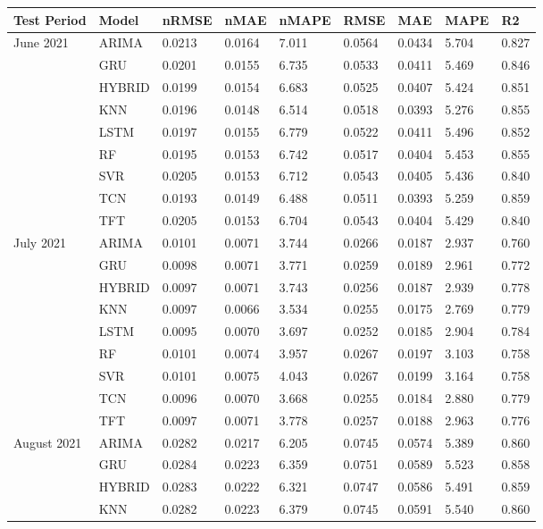 \begin{tabular}{lllllllll}
\toprule
Test Period & Model & nRMSE & nMAE & nMAPE & RMSE & MAE & MAPE & R2 \\
\midrule
June 2021 & ARIMA & 0.0213 & 0.0164 & 7.011 & 0.0564 & 0.0434 & 5.704 & 0.827 \\
 & GRU & 0.0201 & 0.0155 & 6.735 & 0.0533 & 0.0411 & 5.469 & 0.846 \\
 & HYBRID & 0.0199 & 0.0154 & 6.683 & 0.0525 & 0.0407 & 5.424 & 0.851 \\
 & KNN & 0.0196 & 0.0148 & 6.514 & 0.0518 & 0.0393 & 5.276 & 0.855 \\
 & LSTM & 0.0197 & 0.0155 & 6.779 & 0.0522 & 0.0411 & 5.496 & 0.852 \\
 & RF & 0.0195 & 0.0153 & 6.742 & 0.0517 & 0.0404 & 5.453 & 0.855 \\
 & SVR & 0.0205 & 0.0153 & 6.712 & 0.0543 & 0.0405 & 5.436 & 0.840 \\
 & TCN & 0.0193 & 0.0149 & 6.488 & 0.0511 & 0.0393 & 5.259 & 0.859 \\
 & TFT & 0.0205 & 0.0153 & 6.704 & 0.0543 & 0.0404 & 5.429 & 0.840 \\
July 2021 & ARIMA & 0.0101 & 0.0071 & 3.744 & 0.0266 & 0.0187 & 2.937 & 0.760 \\
 & GRU & 0.0098 & 0.0071 & 3.771 & 0.0259 & 0.0189 & 2.961 & 0.772 \\
 & HYBRID & 0.0097 & 0.0071 & 3.743 & 0.0256 & 0.0187 & 2.939 & 0.778 \\
 & KNN & 0.0097 & 0.0066 & 3.534 & 0.0255 & 0.0175 & 2.769 & 0.779 \\
 & LSTM & 0.0095 & 0.0070 & 3.697 & 0.0252 & 0.0185 & 2.904 & 0.784 \\
 & RF & 0.0101 & 0.0074 & 3.957 & 0.0267 & 0.0197 & 3.103 & 0.758 \\
 & SVR & 0.0101 & 0.0075 & 4.043 & 0.0267 & 0.0199 & 3.164 & 0.758 \\
 & TCN & 0.0096 & 0.0070 & 3.668 & 0.0255 & 0.0184 & 2.880 & 0.779 \\
 & TFT & 0.0097 & 0.0071 & 3.778 & 0.0257 & 0.0188 & 2.963 & 0.776 \\
August 2021 & ARIMA & 0.0282 & 0.0217 & 6.205 & 0.0745 & 0.0574 & 5.389 & 0.860 \\
 & GRU & 0.0284 & 0.0223 & 6.359 & 0.0751 & 0.0589 & 5.523 & 0.858 \\
 & HYBRID & 0.0283 & 0.0222 & 6.321 & 0.0747 & 0.0586 & 5.491 & 0.859 \\
 & KNN & 0.0282 & 0.0223 & 6.379 & 0.0745 & 0.0591 & 5.540 & 0.860 \\

\end{tabular}
